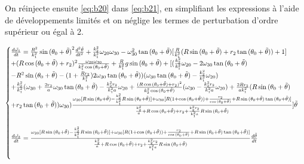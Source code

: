 On réinjecte ensuite \ref{eq:b20} dans \ref{eq:b21}, en simplifiant les expressions à l'aide de développements limités et on néglige les termes de perturbation d'ordre supérieur ou égal à 2.

\begin{equation}
  \begin{cases}
    \frac{d\Tilde{\omega_1}}{dt}=\frac{R^2}{k_1^2}\sin{(\theta_0+\Tilde{\theta})}^2\frac{d^2\Tilde{\theta}}{dt^2}+\frac{k_2^2}{k_1^2}\omega_{20}\omega_{30}-\omega_{30}^2\tan{(\theta_0+\Tilde{\theta})}[\frac{R}{k_1^2}(R\sin{(\theta_0+\Tilde{\theta})}+r_2\tan{(\theta_0+\Tilde{\theta})})+1]\\
    +(R\cos{(\theta_0+\Tilde{\theta})}+r_2)^2\frac{\omega_{20}\omega_{30}}{k_1^2 \cos{(\theta_0+\Tilde{\theta})}}+\frac{R}{k_1^2}g \sin{(\theta_0+\Tilde{\theta})}+[(\frac{k_2^2}{k_1^2}\omega_{20}-2\omega_{30}\tan{(\theta_0+\Tilde{\theta})}\\
    -R^2\sin{(\theta_0+\Tilde{\theta})}-(1+\frac{R r_2}{k_1^2})2\omega_{30}\tan{(\theta_0+\Tilde{\theta})})(\omega_{30}\tan{(\theta_0+\Tilde{\theta})}-\frac{k_2^2}{k_1^2}\omega_{20})\\
    +\frac{k_2^2}{k_1^2}(\omega_{30}+\frac{2r_2}{a}\omega_{30} \tan{(\theta_0+\Tilde{\theta})}-\frac{k_2^2 r_2}{k_1^2 a}\omega_{20}+\frac{(R\cos{(\theta_0+\Tilde{\theta})}+r_2)^2}{k_2^2\cos{(\theta_0+\Tilde{\theta})}}(\omega_{30}-\frac{k_2^2 r_2}{k_1^2 a}\omega_{20})+\frac{2R r_2}{a k_1^2}(R\sin{(\theta_0+\Tilde{\theta})}\\
    +r_2 \tan{(\theta_0+\Tilde{\theta})})\omega_{30})\frac{\omega_{20}[R\sin{(\theta_0+\Tilde{\theta})}-\frac{k_2^2}{k_1^2}R\sin{(\theta_0+\Tilde{\theta})}]+\omega_{30}[R(1+\cos{(\theta_0+\Tilde{\theta})})+\frac{r_2}{\cos{(\theta_0+\Tilde{\theta})}}+R\sin{(\theta_0+\Tilde{\theta})}\tan{(\theta_0+\Tilde{\theta})}]}{\frac{k_2^2}{a}+R\cos{(\theta_0+\Tilde{\theta})}+r_2+\frac{k_2^2 r_2}{k_1^2 a}R\sin{(\theta_0+\Tilde{\theta})}}]\Tilde{\theta} \\
    \\
    
    \frac{d\Tilde{\omega_2}}{dt}=\frac{\omega_{20}[R\sin{(\theta_0+\Tilde{\theta})}-\frac{k_2^2}{k_1^2}R\sin{(\theta_0+\Tilde{\theta})}]+\omega_{30}[R(1+\cos{(\theta_0+\Tilde{\theta})})+\frac{r_2}{\cos{(\theta_0+\Tilde{\theta})}}+R\sin{(\theta_0+\Tilde{\theta})}\tan{(\theta_0+\Tilde{\theta})}]}{\frac{k_2^2}{a}+R\cos{(\theta_0+\Tilde{\theta})}+r_2+\frac{k_2^2 r_2}{k_1^2 a}R\sin{(\theta_0+\Tilde{\theta})}} \frac{d\Tilde{\theta}}{dt}\\
    \\
    

\end{cases}
\end{equation}

